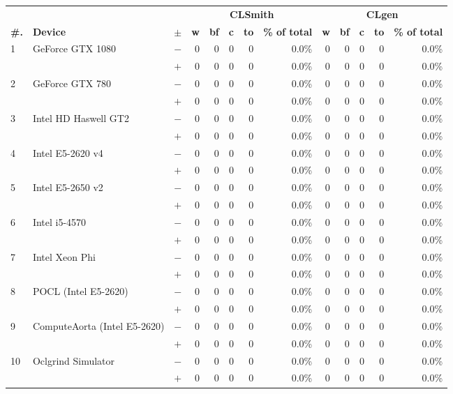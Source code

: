  \begin{tabular}{lll | rrrrr | rrrrr }
  \toprule
  & & & \multicolumn{5}{c|}{\textbf{CLSmith}} & \multicolumn{5}{c}{\textbf{CLgen}} \\
  \textbf{\#.} & \textbf{Device} & $\pm$ &
  \textbf{w} & \textbf{bf} & \textbf{c} & \textbf{to} & \textbf{\% of total} &
  \textbf{w} & \textbf{bf} & \textbf{c} & \textbf{to} & \textbf{\% of total} \\
  \midrule
  \multirow{ 2}{*}{1} & \multirow{ 2}{*}{GeForce GTX 1080} & $-$ & 0 & 0 & 0 & 0 & 0.0\%       & 0 & 0 & 0 & 0 & 0.0\% \\& & $+$ & 0 & 0 & 0 & 0 & 0.0\% & 0 & 0 & 0 & 0 & 0.0\% \\
\hline
\multirow{ 2}{*}{2} & \multirow{ 2}{*}{GeForce GTX 780} & $-$ & 0 & 0 & 0 & 0 & 0.0\%       & 0 & 0 & 0 & 0 & 0.0\% \\& & $+$ & 0 & 0 & 0 & 0 & 0.0\% & 0 & 0 & 0 & 0 & 0.0\% \\
\hline
\multirow{ 2}{*}{3} & \multirow{ 2}{*}{Intel HD Haswell GT2} & $-$ & 0 & 0 & 0 & 0 & 0.0\%       & 0 & 0 & 0 & 0 & 0.0\% \\& & $+$ & 0 & 0 & 0 & 0 & 0.0\% & 0 & 0 & 0 & 0 & 0.0\% \\
\hline
\multirow{ 2}{*}{4} & \multirow{ 2}{*}{Intel E5-2620 v4} & $-$ & 0 & 0 & 0 & 0 & 0.0\%       & 0 & 0 & 0 & 0 & 0.0\% \\& & $+$ & 0 & 0 & 0 & 0 & 0.0\% & 0 & 0 & 0 & 0 & 0.0\% \\
\hline
\multirow{ 2}{*}{5} & \multirow{ 2}{*}{Intel E5-2650 v2} & $-$ & 0 & 0 & 0 & 0 & 0.0\%       & 0 & 0 & 0 & 0 & 0.0\% \\& & $+$ & 0 & 0 & 0 & 0 & 0.0\% & 0 & 0 & 0 & 0 & 0.0\% \\
\hline
\multirow{ 2}{*}{6} & \multirow{ 2}{*}{Intel i5-4570} & $-$ & 0 & 0 & 0 & 0 & 0.0\%       & 0 & 0 & 0 & 0 & 0.0\% \\& & $+$ & 0 & 0 & 0 & 0 & 0.0\% & 0 & 0 & 0 & 0 & 0.0\% \\
\hline
\multirow{ 2}{*}{7} & \multirow{ 2}{*}{Intel Xeon Phi} & $-$ & 0 & 0 & 0 & 0 & 0.0\%       & 0 & 0 & 0 & 0 & 0.0\% \\& & $+$ & 0 & 0 & 0 & 0 & 0.0\% & 0 & 0 & 0 & 0 & 0.0\% \\
\hline
\multirow{ 2}{*}{8} & \multirow{ 2}{*}{POCL (Intel E5-2620)} & $-$ & 0 & 0 & 0 & 0 & 0.0\%       & 0 & 0 & 0 & 0 & 0.0\% \\& & $+$ & 0 & 0 & 0 & 0 & 0.0\% & 0 & 0 & 0 & 0 & 0.0\% \\
\hline
\multirow{ 2}{*}{9} & \multirow{ 2}{*}{ComputeAorta (Intel E5-2620)} & $-$ & 0 & 0 & 0 & 0 & 0.0\%       & 0 & 0 & 0 & 0 & 0.0\% \\& & $+$ & 0 & 0 & 0 & 0 & 0.0\% & 0 & 0 & 0 & 0 & 0.0\% \\
\hline
\multirow{ 2}{*}{10} & \multirow{ 2}{*}{Oclgrind Simulator} & $-$ & 0 & 0 & 0 & 0 & 0.0\%       & 0 & 0 & 0 & 0 & 0.0\% \\& & $+$ & 0 & 0 & 0 & 0 & 0.0\% & 0 & 0 & 0 & 0 & 0.0\% \\
  \bottomrule
\end{tabular}

